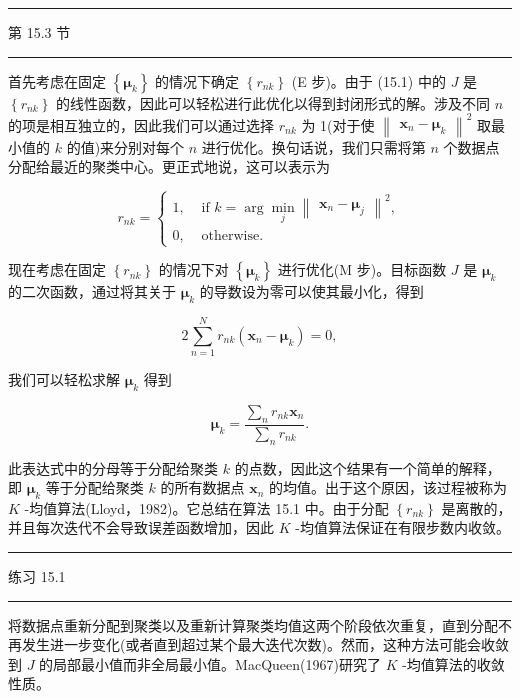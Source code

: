 \documentclass[10pt]{article}
\newcommand{\HRule}{\begin{center}\rule{0.9\linewidth}{0.2mm}\end{center}}
\begin{document}
\HRule

第 15.3 节

\HRule

首先考虑在固定 \(\left\{  {\mathbf{\mu }}_{k}\right\}\) 的情况下确定 \(\left\{  {r}_{nk}\right\}\) (E 步)。由于 (15.1) 中的 \(J\) 是 \(\left\{  {r}_{nk}\right\}\) 的线性函数，因此可以轻松进行此优化以得到封闭形式的解。涉及不同 \(n\) 的项是相互独立的，因此我们可以通过选择 \({r}_{nk}\) 为 1(对于使 \({\begin{Vmatrix}{\mathbf{x}}_{n} - {\mathbf{\mu }}_{k}\end{Vmatrix}}^{2}\) 取最小值的 \(k\) 的值)来分别对每个 \(n\) 进行优化。换句话说，我们只需将第 \(n\) 个数据点分配给最近的聚类中心。更正式地说，这可以表示为

\[
{r}_{nk} = \left\{  \begin{array}{ll} 1, & \text{ if }k = \arg \mathop{\min }\limits_{j}{\begin{Vmatrix}{\mathbf{x}}_{n} - {\mathbf{\mu }}_{j}\end{Vmatrix}}^{2}, \\  0, & \text{ otherwise. } \end{array}\right.  \tag{15.2}
\]

现在考虑在固定 \(\left\{  {r}_{nk}\right\}\) 的情况下对 \(\left\{  {\mathbf{\mu }}_{k}\right\}\) 进行优化(M 步)。目标函数 \(J\) 是 \({\mathbf{\mu }}_{k}\) 的二次函数，通过将其关于 \({\mathbf{\mu }}_{k}\) 的导数设为零可以使其最小化，得到

\[
2\mathop{\sum }\limits_{{n = 1}}^{N}{r}_{nk}\left( {{\mathbf{x}}_{n} - {\mathbf{\mu }}_{k}}\right)  = 0, \tag{15.3}
\]

我们可以轻松求解 \({\mathbf{\mu }}_{k}\) 得到

\[
{\mathbf{\mu }}_{k} = \frac{\mathop{\sum }\limits_{n}{r}_{nk}{\mathbf{x}}_{n}}{\mathop{\sum }\limits_{n}{r}_{nk}}. \tag{15.4}
\]

此表达式中的分母等于分配给聚类 \(k\) 的点数，因此这个结果有一个简单的解释，即 \({\mathbf{\mu }}_{k}\) 等于分配给聚类 \(k\) 的所有数据点 \({\mathbf{x}}_{n}\) 的均值。出于这个原因，该过程被称为 \(K\) -均值算法(Lloyd，1982)。它总结在算法 15.1 中。由于分配 \(\left\{  {r}_{nk}\right\}\) 是离散的，并且每次迭代不会导致误差函数增加，因此 \(K\) -均值算法保证在有限步数内收敛。

\HRule

练习 15.1

\HRule

将数据点重新分配到聚类以及重新计算聚类均值这两个阶段依次重复，直到分配不再发生进一步变化(或者直到超过某个最大迭代次数)。然而，这种方法可能会收敛到 \(J\) 的局部最小值而非全局最小值。MacQueen(1967)研究了 \(K\) -均值算法的收敛性质。
\end{document}
